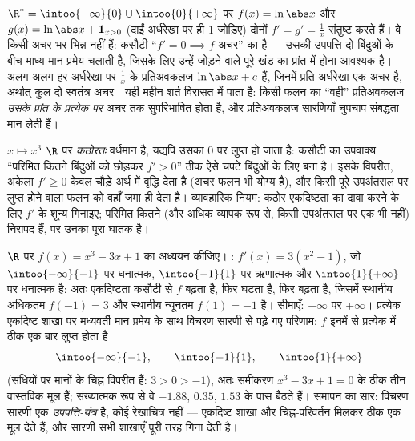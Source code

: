 \begin{example}\label{ex:b1:derivative:intervalmatters}
$\R^* = \intoo{-\infty}{0} \cup \intoo{0}{+\infty}$ पर $f(x) = \ln\abs x$ और
$g(x) = \ln\abs x + \mathbf{1}_{x>0}$ (दाईं अर्धरेखा पर ही $1$ जोड़िए) दोनों
$f' = g' = \frac1x$ संतुष्ट करते हैं। वे किसी अचर भर भिन्न नहीं हैं: कसौटी
``$f' = 0 \implies f$ अचर'' \emph{} का  है --- उसकी उपपत्ति दो
बिंदुओं के बीच माध्य मान प्रमेय चलाती है, जिसके लिए उन्हें जोड़ने वाले पूरे
खंड का प्रांत में होना आवश्यक है। अलग-अलग हर अर्धरेखा पर $\frac1x$ के
प्रतिअवकलज $\ln\abs x + c$ हैं, जिनमें प्रति अर्धरेखा एक अचर है, अर्थात् कुल
दो स्वतंत्र अचर।  यही महीन शर्त विरासत में पाता है:
किसी फलन का ``वही'' प्रतिअवकलज \emph{उसके प्रांत के प्रत्येक  पर} अचर
तक सुपरिभाषित होता है, और प्रतिअवकलज सारणियाँ चुपचाप संबद्धता मान लेती हैं।
\end{example}

\begin{example}[कठोरता मुफ़्त में]\label{ex:b1:derivative:strictness}
$x \mapsto x^3$ $\R$ पर \emph{कठोरतः} वर्धमान है, यद्यपि उसका  $0$ पर
लुप्त हो जाता है: कसौटी का उपवाक्य ``परिमित कितने बिंदुओं को छोड़कर $f' >
0$'' ठीक ऐसे चपटे बिंदुओं के लिए बना है। इसके विपरीत, अकेला $f' \geq 0$ केवल
चौड़े अर्थ में वृद्धि देता है (अचर फलन भी योग्य है), और किसी पूरे उपअंतराल
पर लुप्त होने वाला  फलन को वहाँ जमा ही देता है। व्यावहारिक नियम: कठोर
एकदिष्टता का दावा करने के लिए $f'$ के शून्य गिनाइए; परिमित कितने (और अधिक
व्यापक रूप से, किसी उपअंतराल पर एक भी नहीं) निरापद हैं, पर उनका पूरा 
घातक है।
\end{example}

\begin{example}\label{ex:b1:derivative:variations}
$\R$ पर $f(x) = x^3 - 3x + 1$ का अध्ययन कीजिए। : $f'(x) = 3(x^2 - 1)$,
जो $\intoo{-\infty}{-1}$ पर धनात्मक, $\intoo{-1}{1}$ पर ऋणात्मक और
$\intoo{1}{+\infty}$ पर धनात्मक है: अतः एकदिष्टता कसौटी से $f$ बढ़ता है, फिर
घटता है, फिर बढ़ता है, जिसमें स्थानीय अधिकतम $f(-1) = 3$ और स्थानीय न्यूनतम
$f(1) = -1$ है। सीमाएँ: $\mp\infty$ पर $\mp\infty$। प्रत्येक एकदिष्ट शाखा पर
मध्यवर्ती मान प्रमेय के साथ विचरण सारणी से पढ़े गए परिणाम: $f$ इनमें से
प्रत्येक में ठीक एक बार लुप्त होता है
\[
\intoo{-\infty}{-1}, \qquad \intoo{-1}{1}, \qquad
\intoo{1}{+\infty}
\]
(संधियों पर मानों के चिह्न विपरीत हैं: $3 > 0 > -1$), अतः समीकरण $x^3 - 3x +
1 = 0$ के ठीक तीन वास्तविक मूल हैं; संख्यात्मक रूप से वे $-1.88$, $0.35$,
$1.53$ के पास बैठते हैं। समापन का सार: विचरण सारणी एक \emph{उपपत्ति-यंत्र}
है, कोई रेखाचित्र नहीं --- एकदिष्ट शाखा और चिह्न-परिवर्तन मिलकर ठीक एक मूल
देते हैं, और सारणी सभी शाखाएँ पूरी तरह गिना देती है।
\end{example}

